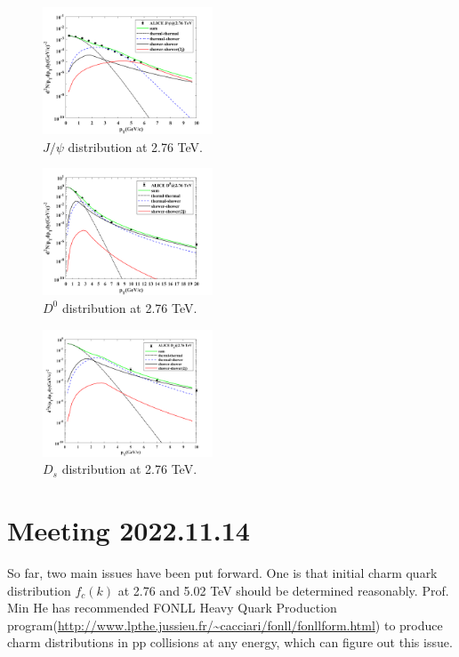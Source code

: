 \documentclass[twocolumn,aps,superscriptaddress,nofootinbib,floatfix]{revtex4}
\begin{document}
\begin{figure}[H]
	\includegraphics[width=0.45\textwidth]{2p_3_30.png}
	\caption{$J/\psi$ distribution at 2.76 TeV. }
	\label{fig23}
\end{figure}
\begin{figure}[H]
	\includegraphics[width=0.45\textwidth]{D0_1106.png}
	\caption{$D^0$ distribution at 2.76 TeV. }
	\label{fig24}
\end{figure}
\begin{figure}[H]
	\includegraphics[width=0.45\textwidth]{Ds_1106.png}
	\caption{$D_s$ distribution at 2.76 TeV. }
	\label{fig25}
\end{figure}


\section{Meeting 2022.11.14}
So far, two main issues have been put forward. One is that initial charm quark distribution $f_c(k)$ at 2.76 and 5.02 TeV should be determined reasonably. Prof. Min He has recommended FONLL Heavy Quark Production program(\url{http://www.lpthe.jussieu.fr/~cacciari/fonll/fonllform.html}) to produce charm distributions in pp collisions at any energy, which can figure out this issue.
\end{document}
